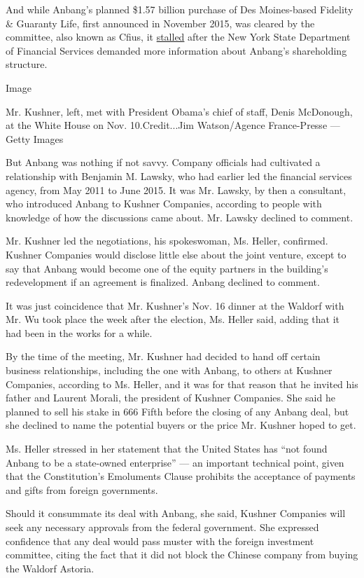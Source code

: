 And while Anbang's planned \$1.57 billion purchase of Des Moines-based
Fidelity \& Guaranty Life, first announced in November 2015, was cleared
by the committee, also known as Cfius, it
\href{http://www.nytimes.com/2016/06/02/business/dealbook/anbang-fidelity-guaranty-life.html}{stalled}
after the New York State Department of Financial Services demanded more
information about Anbang's shareholding structure.

Image

Mr. Kushner, left, met with President Obama's chief of staff, Denis
McDonough, at the White House on Nov. 10.Credit...Jim Watson/Agence
France-Presse --- Getty Images

But Anbang was nothing if not savvy. Company officials had cultivated a
relationship with Benjamin M. Lawsky, who had earlier led the financial
services agency, from May 2011 to June 2015. It was Mr. Lawsky, by then
a consultant, who introduced Anbang to Kushner Companies, according to
people with knowledge of how the discussions came about. Mr. Lawsky
declined to comment.

Mr. Kushner led the negotiations, his spokeswoman, Ms. Heller,
confirmed. Kushner Companies would disclose little else about the joint
venture, except to say that Anbang would become one of the equity
partners in the building's redevelopment if an agreement is finalized.
Anbang declined to comment.

It was just coincidence that Mr. Kushner's Nov. 16 dinner at the Waldorf
with Mr. Wu took place the week after the election, Ms. Heller said,
adding that it had been in the works for a while.

By the time of the meeting, Mr. Kushner had decided to hand off certain
business relationships, including the one with Anbang, to others at
Kushner Companies, according to Ms. Heller, and it was for that reason
that he invited his father and Laurent Morali, the president of Kushner
Companies. She said he planned to sell his stake in 666 Fifth before the
closing of any Anbang deal, but she declined to name the potential
buyers or the price Mr. Kushner hoped to get.

Ms. Heller stressed in her statement that the United States has ``not
found Anbang to be a state-owned enterprise'' --- an important technical
point, given that the Constitution's Emoluments Clause prohibits the
acceptance of payments and gifts from foreign governments.

Should it consummate its deal with Anbang, she said, Kushner Companies
will seek any necessary approvals from the federal government. She
expressed confidence that any deal would pass muster with the foreign
investment committee, citing the fact that it did not block the Chinese
company from buying the Waldorf Astoria.

